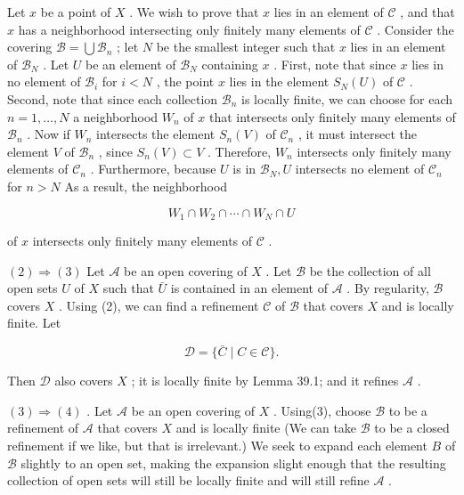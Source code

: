Let \(x\) be a point of \(X\) . We wish to prove that \(x\) lies in an element of \(\mathcal{C}\) , and that \(x\) has a neighborhood intersecting only finitely many elements of \(\mathcal{C}\) . Consider the covering \(\mathcal{B} = \bigcup {\mathcal{B}}_{n}\) ; let \(N\) be the smallest integer such that \(x\) lies in an element of \({\mathcal{B}}_{N}\) . Let \(U\) be an element of \({\mathcal{B}}_{N}\) containing \(x\) . First, note that since \(x\) lies in no element of \({\mathcal{B}}_{i}\) for \(i < N\) , the point \(x\) lies in the element \({S}_{N}\left( U\right)\) of \(\mathcal{C}\) . Second, note that since each collection \({\mathcal{B}}_{n}\) is locally finite, we can choose for each \(n = 1,\ldots ,N\) a neighborhood \({W}_{n}\) of \(x\) that intersects only finitely many elements of \({\mathcal{B}}_{n}\) . Now if \({W}_{n}\) intersects the element \({S}_{n}\left( V\right)\) of \({\mathcal{C}}_{n}\) , it must intersect the element \(V\) of \({\mathcal{B}}_{n}\) , since \({S}_{n}\left( V\right)  \subset  V\) . Therefore, \({W}_{n}\) intersects only finitely many elements of \({\mathcal{C}}_{n}\) . Furthermore, because \(U\) is in \({\mathcal{B}}_{N},U\) intersects no element of \({\mathcal{C}}_{n}\) for \(n > N\) As a result, the neighborhood

\[
{W}_{1} \cap  {W}_{2} \cap  \cdots  \cap  {W}_{N} \cap  U
\]

of \(x\) intersects only finitely many elements of \(\mathcal{C}\) .

\(\left( 2\right)  \Rightarrow  \left( 3\right)\) Let \(\mathcal{A}\) be an open covering of \(X\) . Let \(\mathcal{B}\) be the collection of all open sets \(U\) of \(X\) such that \(\bar{U}\) is contained in an element of \(\mathcal{A}\) . By regularity, \(\mathcal{B}\) covers \(X\) . Using (2), we can find a refinement \(\mathcal{C}\) of \(\mathcal{B}\) that covers \(X\) and is locally finite. Let

\[
\mathcal{D} = \{ \bar{C} \mid  C \in  \mathcal{C}\} .
\]

Then \(\mathcal{D}\) also covers \(X\) ; it is locally finite by Lemma 39.1; and it refines \(\mathcal{A}\) .

\(\left( 3\right)  \Rightarrow  \left( 4\right)\) . Let \(\mathcal{A}\) be an open covering of \(X\) . Using(3), choose \(\mathcal{B}\) to be a refinement of \(\mathcal{A}\) that covers \(X\) and is locally finite (We can take \(\mathcal{B}\) to be a closed refinement if we like, but that is irrelevant.) We seek to expand each element \(B\) of \(\mathcal{B}\) slightly to an open set, making the expansion slight enough that the resulting collection of open sets will still be locally finite and will still refine \(\mathcal{A}\) .

